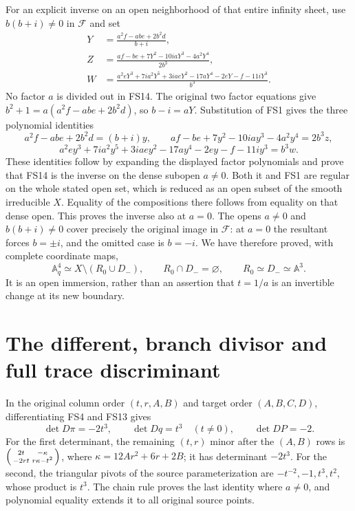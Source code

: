 \documentclass[11pt]{article}
\begin{document}
For an explicit inverse on an open neighborhood of that
entire infinity sheet, use $b(b+i)\ne0$ in $\mathcal F$
and set
\begin{align}
Y&=\frac{a^2f-abe+2b^2d}{b+i},\nonumber\\
Z&=\frac{af-be+7Y^2-10iaY^3-4a^2Y^4}{2b^3},\nonumber\\
W&=\frac{a^2eY^3+7ia^2Y^5+3iaeY^2-17aY^4
                       -2eY-f-11iY^3}{b^3}.
\tag{FS14}
\end{align}
No factor $a$ is divided out in FS14. The original two
factor equations give
$b^2+1=a(a^2f-abe+2b^2d)$, so $b-i=aY$.
Substitution of FS1 gives the three polynomial identities
\[
a^2f-abe+2b^2d=(b+i)y,\qquad
af-be+7y^2-10iay^3-4a^2y^4=2b^3z,
\]
\[
a^2ey^3+7ia^2y^5+3iaey^2-17ay^4-2ey-f-11iy^3=b^3w.
\]
These identities follow by expanding the displayed factor
polynomials and prove that FS14 is the inverse on the
dense subopen $a\ne0$. Both it and FS1 are regular on
the whole stated open set, which is reduced as an open
subset of the smooth irreducible $X$. Equality of the
compositions there follows from equality on that dense
open. This proves the inverse also at $a=0$.
The opens $a\ne0$ and $b(b+i)\ne0$ cover precisely the
original image in $\mathcal F$: at $a=0$ the resultant
forces $b=\pm i$, and the omitted case is $b=-i$.
We have therefore proved, with complete coordinate maps,
\begin{equation}
\mathbb A^4_q\simeq X\setminus(R_0\cup D_-),\qquad
R_0\cap D_-=\varnothing,\qquad
R_0\simeq D_-\simeq\mathbb A^3 .
\tag{FS15}
\end{equation}
It is an open immersion, rather than an assertion that
$t=1/a$ is an invertible change at its new boundary.

\section{The different, branch divisor and full trace discriminant}
In the original column order $(t,r,A,B)$ and target order
$(A,B,C,D)$, differentiating FS4 and FS13 gives
\begin{equation}
\det D\pi=-2t^3,\qquad
\det Dq=t^3\quad(t\ne0),\qquad
\det DP=-2.
\tag{FS16}
\end{equation}
For the first determinant, the remaining $(t,r)$ minor
after the $(A,B)$ rows is
$\begin{psmallmatrix}2t&-\kappa\\-2rt&r\kappa-t^2\end{psmallmatrix}$,
where $\kappa=12Ar^2+6r+2B$; it has determinant $-2t^3$.
For the second, the triangular pivots of the source
parameterization are $-t^{-2},-1,t^3,t^2$, whose product
is $t^3$. The chain rule proves the last identity where
$a\ne0$, and polynomial equality extends it to all original
source points.
\end{document}
